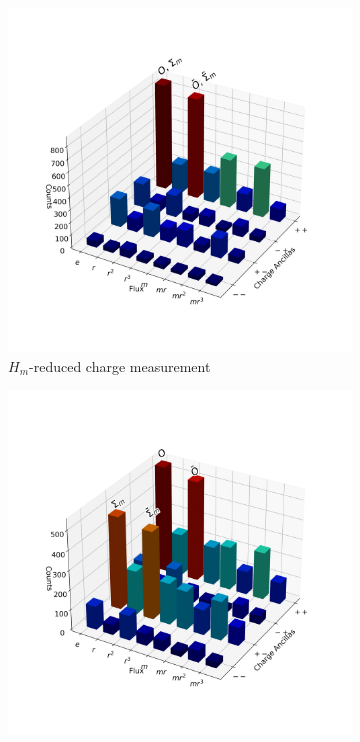 \documentclass[a4paper,twocolumn,11pt, accepted=2024-06-14]{quantumarticle}
\begin{document}
\begin{figure}
    \centering
    \begin{subfigure}{0.49\linewidth}
        \centering
        \includegraphics[width=\linewidth]{Figures/basket_m.png}
        \caption{$H_m$-reduced charge measurement}
        \label{fig:basket_Hm}
    \end{subfigure}
    \begin{subfigure}{0.49\linewidth}
        \centering
        \includegraphics[width=\linewidth]{Figures/basket_mr.png}

\end{subfigure}
\end{figure}
\end{document}
